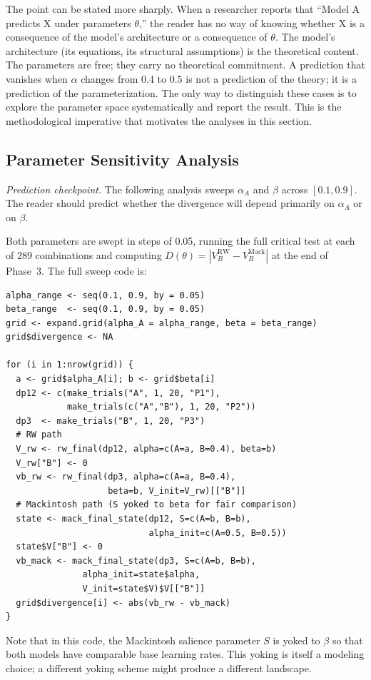 \documentclass[fleqn,10pt]{wlscirep}
\begin{document}
\begin{linenumbers}
The point can be stated more sharply. When a researcher reports that ``Model A predicts X under parameters $\theta$,'' the reader has no way of knowing whether X is a consequence of the model's architecture or a consequence of $\theta$. The model's architecture (its equations, its structural assumptions) is the theoretical content. The parameters are free; they carry no theoretical commitment. A prediction that vanishes when $\alpha$ changes from 0.4 to 0.5 is not a prediction of the theory; it is a prediction of the parameterization. The only way to distinguish these cases is to explore the parameter space systematically and report the result. This is the methodological imperative that motivates the analyses in this section.

\subsection{Parameter Sensitivity Analysis}

\emph{Prediction checkpoint.} The following analysis sweeps $\alpha_A$ and $\beta$ across $[0.1, 0.9]$. The reader should predict whether the divergence will depend primarily on $\alpha_A$ or on $\beta$.

Both parameters are swept in steps of 0.05, running the full critical test at each of 289 combinations and computing $D(\theta) = |V_B^{\text{RW}} - V_B^{\text{Mack}}|$ at the end of Phase~3. The full sweep code is:
\begin{verbatim}
alpha_range <- seq(0.1, 0.9, by = 0.05)
beta_range  <- seq(0.1, 0.9, by = 0.05)
grid <- expand.grid(alpha_A = alpha_range, beta = beta_range)
grid$divergence <- NA

for (i in 1:nrow(grid)) {
  a <- grid$alpha_A[i]; b <- grid$beta[i]
  dp12 <- c(make_trials("A", 1, 20, "P1"),
            make_trials(c("A","B"), 1, 20, "P2"))
  dp3  <- make_trials("B", 1, 20, "P3")
  # RW path
  V_rw <- rw_final(dp12, alpha=c(A=a, B=0.4), beta=b)
  V_rw["B"] <- 0
  vb_rw <- rw_final(dp3, alpha=c(A=a, B=0.4),
                    beta=b, V_init=V_rw)[["B"]]
  # Mackintosh path (S yoked to beta for fair comparison)
  state <- mack_final_state(dp12, S=c(A=b, B=b),
                            alpha_init=c(A=0.5, B=0.5))
  state$V["B"] <- 0
  vb_mack <- mack_final_state(dp3, S=c(A=b, B=b),
               alpha_init=state$alpha,
               V_init=state$V)$V[["B"]]
  grid$divergence[i] <- abs(vb_rw - vb_mack)
}
\end{verbatim}
Note that in this code, the Mackintosh salience parameter $S$ is yoked to $\beta$ so that both models have comparable base learning rates. This yoking is itself a modeling choice; a different yoking scheme might produce a different landscape.


\end{linenumbers}
\end{document}
